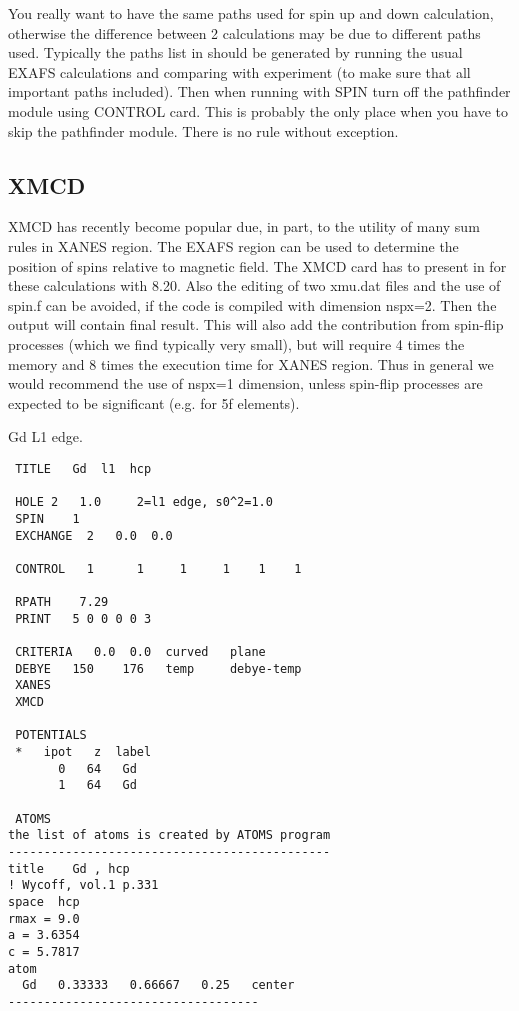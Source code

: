 \documentclass[11pt,oneside]{report} %
\begin{document}
You really want to have the same paths used for spin up and down
calculation, otherwise the difference between 2 calculations may be
due to different paths used. Typically the paths list in
 should be generated by running the usual EXAFS
calculations and comparing with experiment (to make sure that all
important paths included). Then when running with SPIN turn off the
pathfinder module using CONTROL card.  This is probably the only place
when you have to skip the pathfinder module.  There is no rule without
exception.


\subsection{XMCD}
\label{sec:XMCD}

XMCD has recently become popular due, in part, to the utility of
many sum rules in XANES region. The EXAFS region can be used
to determine the position of spins relative to magnetic field.
The XMCD card has to present in  for these
calculations with {\feff}8.20. Also  the editing of two xmu.dat files
and the use of spin.f can be avoided, if the code is compiled
with dimension nspx=2. Then the output  will contain
final result. This will also add the contribution from spin-flip
processes (which we find typically very small), but will require
4 times the memory and 8 times the execution time for XANES region.
Thus in general we would recommend the use of nspx=1 dimension,
unless spin-flip processes are expected to be significant
(e.g. for 5f elements). 


Gd L1  edge.

\begin{verbatim}
 TITLE   Gd  l1  hcp

 HOLE 2   1.0     2=l1 edge, s0^2=1.0
 SPIN    1
 EXCHANGE  2   0.0  0.0

 CONTROL   1      1     1     1    1    1

 RPATH    7.29
 PRINT   5 0 0 0 0 3

 CRITERIA   0.0  0.0  curved   plane
 DEBYE   150    176   temp     debye-temp
 XANES
 XMCD

 POTENTIALS
 *   ipot   z  label
       0   64   Gd
       1   64   Gd

 ATOMS
the list of atoms is created by ATOMS program
---------------------------------------------
title    Gd , hcp
! Wycoff, vol.1 p.331
space  hcp
rmax = 9.0
a = 3.6354
c = 5.7817
atom
  Gd   0.33333   0.66667   0.25   center
-----------------------------------
\end{verbatim}
\end{document}
